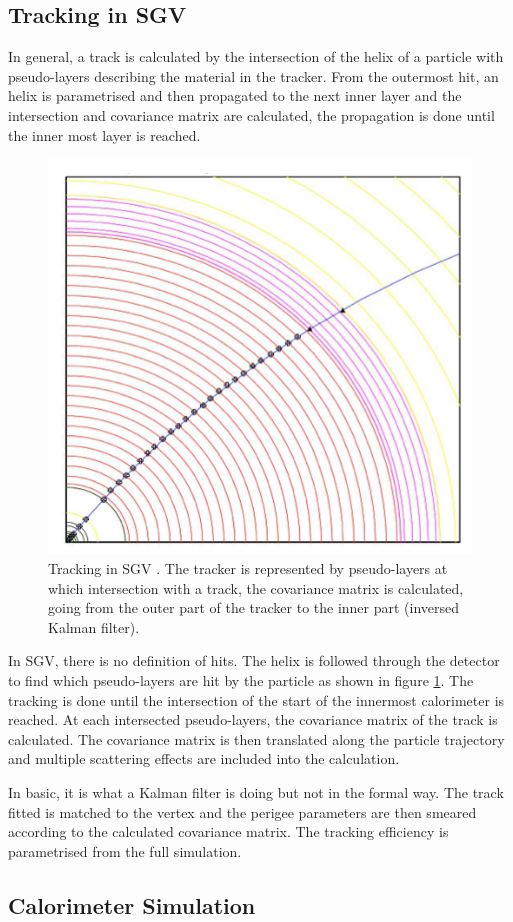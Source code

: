 \subsection{Tracking in SGV}

In general, a track is calculated by the intersection of the helix of a particle with pseudo-layers describing the material in the tracker. From the outermost hit, an helix is parametrised and then propagated to the next inner layer and the intersection and covariance matrix are calculated, the propagation is done until the inner most layer is reached.

\begin{figure}[htbp!]
  \centering
  \includegraphics[width=0.3\linewidth]{Appendixes/fig_SGV/Tracking_SGV.png}
  \caption{Tracking in SGV \cite{Berggren2012}. The tracker is represented by pseudo-layers at which intersection with a track, the covariance matrix is calculated, going from the outer part of the tracker to the inner part (inversed Kalman filter).}
  \label{fig:tracking_sgv}
\end{figure}

In SGV, there is no definition of hits. The helix is followed through the detector to find which pseudo-layers are hit by the particle as shown in figure \ref{fig:tracking_sgv}. The tracking is done until the intersection of the start of the innermost calorimeter is reached. At each intersected pseudo-layers, the covariance matrix of the track is calculated. The covariance matrix is then translated along the particle trajectory and multiple scattering effects are included into the calculation.

In basic, it is what a Kalman filter \cite{Li2013} is doing but not in the formal way. The track fitted is matched to the vertex and the perigee parameters are then smeared according to the calculated covariance matrix. The tracking efficiency is parametrised from the full simulation.

\subsection{Calorimeter Simulation}


